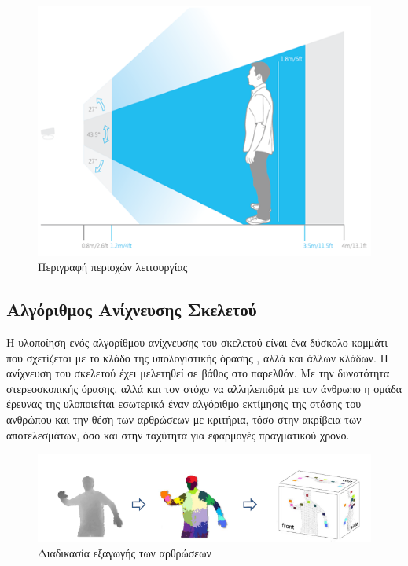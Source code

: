 \begin{figure}[H]
    \centering
    \includegraphics[width=.8\textwidth, height=.35\textheight]{kinect/fig/kinect-operation-mode.png}
    \caption{Περιγραφή περιοχών λειτουργίας\protect\footnotemark}
    \label{fig:kinect-operation-mode}
\end{figure}

\subsection{Αλγόριθμος Ανίχνευσης Σκελετού}

Η υλοποίηση ενός αλγορίθμου ανίχνευσης του σκελετού είναι ένα δύσκολο κομμάτι που σχετίζεται με το κλάδο της υπολογιστικής όρασης \cite{mubarak97}, αλλά και άλλων κλάδων. Η ανίχνευση του σκελετού έχει μελετηθεί σε βάθος \cite{moseslund01, poppe07} στο παρελθόν. Με την δυνατότητα στερεοσκοπικής όρασης, αλλά και τον στόχο να αλληλεπιδρά με τον άνθρωπο η ομάδα έρευνας της  υλοποιείται εσωτερικά έναν αλγόριθμο εκτίμησης της στάσης του ανθρώπου και την θέση των αρθρώσεων \cite{shotton11} με κριτήρια, τόσο στην ακρίβεια των αποτελεσμάτων, όσο και στην ταχύτητα για εφαρμογές πραγματικού χρόνο.

\begin{figure}[H]
    \centering
    \includegraphics[width=.9\textwidth]{kinect/fig/kinect-skeleton-algorithm.png}
    \caption{Διαδικασία εξαγωγής των αρθρώσεων\cite{shotton11}}
    \label{fig:kinect-skeleton-algorithm}
\end{figure}

